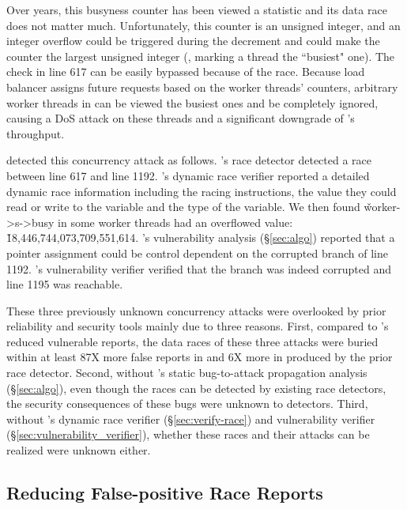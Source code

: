 Over years, this busyness counter has been viewed a statistic and its 
data race does not matter much. Unfortunately, this counter is an unsigned 
integer, and an integer overflow could be triggered during the decrement and 
could make the counter the largest unsigned integer (\ie, marking a thread the 
``busiest" one). The check in line 617 can be easily bypassed because of the 
race. Because load balancer assigns future requests based on the worker 
threads' counters, arbitrary worker threads in \apache can be viewed the 
busiest ones and be completely ignored, causing a DoS attack on these threads 
and a significant downgrade of \apache's throughput.

\xxx detected this concurrency attack as follows. \xxx's race detector detected 
a race between line 617 and line 1192. \xxx's dynamic race verifier reported 
a detailed dynamic race information including the racing instructions, the 
value they could read or write to the variable and the type of the variable. 
We then found \v{worker->s->busy} in some worker threads had an overflowed 
value: \v{18,446,744,073,709,551,614}. \xxx's vulnerability analysis 
(\S\ref{sec:algo}) reported that a pointer assignment could be control dependent 
on the corrupted branch of line 1192. \xxx's vulnerability verifier verified 
that the branch was indeed corrupted and line 1195 was reachable.

These three previously unknown concurrency attacks were overlooked by 
prior reliability and security tools mainly due to three reasons. First, 
compared to \xxx's reduced vulnerable reports, the data races of these three 
attacks were buried within at least 87X more false reports in \apache and 6X 
more in \ssdb produced by the prior \tsan race detector. Second, without 
\xxx's static bug-to-attack propagation analysis (\S\ref{sec:algo}), even though 
the races can be detected by existing race detectors, the security 
consequences of these bugs were unknown to detectors. Third, without 
\xxx's dynamic race verifier (\S\ref{sec:verify-race}) and 
vulnerability verifier (\S\ref{sec:vulnerability_verifier}), whether these 
races and their attacks can be realized were unknown either.



\subsection{Reducing False-positive Race Reports}

